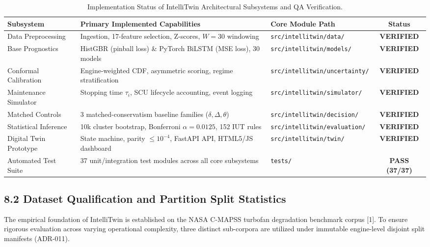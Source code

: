 \documentclass[12pt,a4paper]{article}
\begin{document}
\begin{table}[htbp]
\centering
\caption{Implementation Status of IntelliTwin Architectural Subsystems and QA Verification.}
\label{tab:implementation_status}
\small
\begin{tabularx}{\textwidth}{lXlc}
\toprule
\textbf{Subsystem} & \textbf{Primary Implemented Capabilities} & \textbf{Core Module Path} & \textbf{Status} \\
\midrule
Data Preprocessing & Ingestion, 17-feature selection, Z-scores, $W=30$ windowing & \texttt{src/intellitwin/data/} & \textbf{VERIFIED} \\
Base Prognostics & HistGBR (pinball loss) \& PyTorch BiLSTM (MSE loss), 30 models & \texttt{src/intellitwin/models/} & \textbf{VERIFIED} \\
Conformal Calibration & Engine-weighted CDF, asymmetric scoring, regime stratification & \texttt{src/intellitwin/uncertainty/} & \textbf{VERIFIED} \\
Maintenance Simulator & Stopping time $\tau_i$, SCU lifecycle accounting, event logging & \texttt{src/intellitwin/simulator/} & \textbf{VERIFIED} \\
Matched Controls & 3 matched-conservatism baseline families ($\delta, \Delta, \theta$) & \texttt{src/intellitwin/decision/} & \textbf{VERIFIED} \\
Statistical Inference & 10k cluster bootstrap, Bonferroni $\alpha=0.0125$, 152 IUT rules & \texttt{src/intellitwin/evaluation/} & \textbf{VERIFIED} \\
Digital Twin Prototype & State machine, parity $\le 10^{-4}$, FastAPI API, HTML5/JS dashboard & \texttt{src/intellitwin/twin/} & \textbf{VERIFIED} \\
Automated Test Suite & 37 unit/integration test modules across all core subsystems & \texttt{tests/} & \textbf{PASS (37/37)} \\
\bottomrule
\end{tabularx}
\end{table}

\subsection*{8.2 Dataset Qualification and Partition Split Statistics}
The empirical foundation of IntelliTwin is established on the NASA C-MAPSS turbofan degradation benchmark corpus [1]. To ensure rigorous evaluation across varying operational complexity, three distinct sub-corpora are utilized under immutable engine-level disjoint split manifests (ADR-011).
\end{document}
